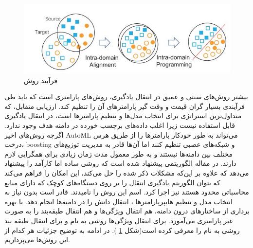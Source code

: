 {\begin{figure}
	\centering
	\includegraphics[scale=0.6]{images/easyTL.JPG}
	\caption{ فرآیند روش 
	  }
	\label{fig:6}
\end{figure}
		 بیشتر روش‌های سنتی و عمیق در انتقال یادگیری، روش‌های پارامتری است که باید طی فرآیندی بسیار گران قیمت و وقت گیر پارامترهای آن را تنظیم کند. ارزیابی متقابل، که متداول‌ترین استراتژی برای انتخاب مدل‌ها و تنظیم پارامترها است، در انتقال یادگیری قابل استفاده نیست زیرا اغلب داده‌های برچسب خورده در دامنه هدف وجود ندارد. اگرچه روش‌های اخیر AutoML می‌تواند به طور خودکار پارامترها را از طریق هرس درخت، boosting و شبکه‌های عصبی تنظیم کنند اما آن‌ها قادر به مدیریت توزیع‌های مختلف بین دامنه‌ها نیستند و به طور معمول مدت زمان زیادی برای همگرایی لازم دارند. در مقاله
\cite{wang2019easy}
الگوریتمی پیشنهاد شده است که روشی ساده اما کارآمد را پیشنهاد می‌دهد که علاوه بر این‌که مشکلات ذکر شده را حل می‌کند، این امکان را فراهم می‌کند که بتوان الگوریتم یادگیری انتقال را بر روی دستگاه‌های کوچک که دارای منایع محاسباتی محدود هستند نیز اجرا کرد. اسم این روش را
نامیدند.
قادر است بدون نیاز به انتخاب مدل و تنظیم هایپرپارامترها ، انتقال دانش را در دامنه‌ها انجام دهد.
با بهره برداری از ساختارهای درون دامنه، هم انتقال ویژگی‌ها و هم انتقال طبقه‌بند را به صورت غیر پارامتری می‌آموزد. برای انتقال ویژگی‌ها روشی به نام
 و برای انتقال طبقه بند روشی به نام
  را معرفی کرده است(شکل 
\ref{fig:6}
  ). در ادامه به توضیح جزئیات هر کدام از این روش‌ها می‌پردازیم.
\subsubsection{ }
\subsubsection{}
}





